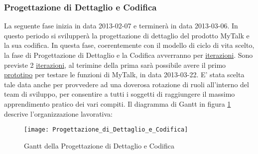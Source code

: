 \clearpage
\subsubsection{Progettazione di Dettaglio e Codifica}
La seguente fase inizia in data 2013-02-07 e terminerà in data 2013-03-06. In questo periodo si svilupperà la progettazione di dettaglio del prodotto MyTalk e la sua codifica.
In questa fase, coerentemente con il modello di ciclo di vita scelto, la fase di Progettazione di Dettaglio e la Codifica avverranno per \underline{iterazioni}.
Sono previste 2 \underline{iterazioni}, al terimine della prima sarà possibile avere il primo \underline{prototipo} per testare le funzioni di MyTalk, in data 2013-03-22.
E' stata scelta tale data anche per provvedere ad una doverosa rotazione di ruoli all'interno del team di sviluppo, per consentire a tutti i soggetti di raggiungere il massimo apprendimento pratico dei vari compiti.
Il diagramma di Gantt in figura \ref{fig:gantdc} descrive l'organizzazione lavorativa:\\

\begin{figure}[h!]
  \texttt{[image: Progettazione\_di\_Dettaglio\_e\_Codifica]}
\caption{Gantt della Progettazione di Dettaglio e Codifica}\label{fig:gantdc}
\end{figure}

